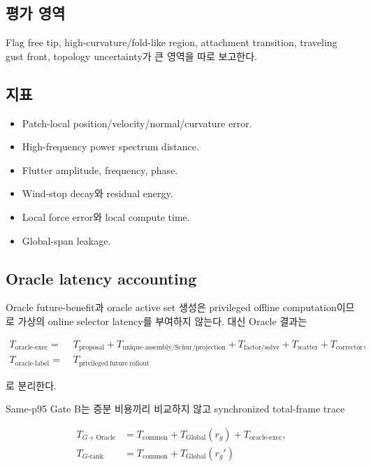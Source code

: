 \documentclass[11pt,a4paper]{article}
\begin{document}
\subsection*{평가 영역}

Flag free tip, high-curvature/fold-like region, attachment transition,
traveling gust front, topology uncertainty가 큰 영역을 따로 보고한다.

\subsection*{지표}

\begin{itemize}[leftmargin=1.5em]
  \item Patch-local position/velocity/normal/curvature error.
  \item High-frequency power spectrum distance.
  \item Flutter amplitude, frequency, phase.
  \item Wind-stop decay와 residual energy.
  \item Local force error와 local compute time.
  \item Global-span leakage.
\end{itemize}

\subsection*{Oracle latency accounting}

Oracle future-benefit과 oracle active set 생성은 privileged offline computation이므로
가상의 online selector latency를 부여하지 않는다.
대신 Oracle 결과는

\begin{equation}
\begin{aligned}
  T_{\mathrm{oracle\mbox{-}exec}}
  =&\;T_{\mathrm{proposal}}
  +T_{\mathrm{unique\mbox{-}assembly/Schur/projection}}
  +T_{\mathrm{factor/solve}}
  +T_{\mathrm{scatter}}
  +T_{\mathrm{corrector}},\\
  T_{\mathrm{oracle\mbox{-}label}}
  =&\;T_{\mathrm{privileged\ future\ rollout}}
  \label{eq:oracle-latency-accounting}
\end{aligned}
\end{equation}

로 분리한다.

Same-p95 Gate B는 증분 비용끼리 비교하지 않고 synchronized total-frame trace

\begin{equation}
\begin{aligned}
  T_{G+\mathrm{Oracle}}
  &=T_{\mathrm{common}}+T_{\mathrm{Global}}(r_g)
    +T_{\mathrm{oracle\mbox{-}exec}},\\
  T_{G\mathrm{\mbox{-}rank}}
  &=T_{\mathrm{common}}+T_{\mathrm{Global}}(r_g')
  \label{eq:oracle-total-latency-fairness}
\end{aligned}
\end{equation}
\end{document}
